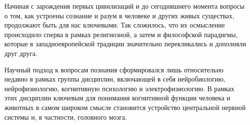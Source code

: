 


{\actuality}


Начиная с зарождения первых цивилизаций и до сегодняшнего момента вопросы о
том, как устроены сознание и разум в человеке и других живых существах,
продолжают быть для нас ключевыми.  Так сложилось, что их осмысление
происходило сперва в рамках религиозной, а затем и философской парадигмы,
которые в западноевропейской традиции значительно перекликались и дополняли
друг друга.

Научный подход к вопросам познания сформировался лишь относительно недавно в рамках группы
дисциплин, включающей в себя нейробиологию, нейрофизиологию, когнитивную психологию и
электрофизиологию. В рамках этих дисциплин ключевым для понимания когнитивной функции человека
и животных в самом широком смысле становится устройство центральной нервной системы и, в частности,
головного мозга.

